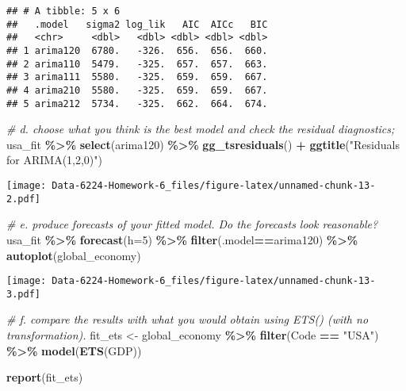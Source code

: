 \documentclass[
]{article}
\newenvironment{Shaded}{\begin{snugshade}}{\end{snugshade}}
\newcommand{\AttributeTok}[1]{\textcolor[rgb]{0.13,0.29,0.53}{#1}}
\newcommand{\CommentTok}[1]{\textcolor[rgb]{0.56,0.35,0.01}{\textit{#1}}}
\newcommand{\DecValTok}[1]{\textcolor[rgb]{0.00,0.00,0.81}{#1}}
\newcommand{\FunctionTok}[1]{\textcolor[rgb]{0.13,0.29,0.53}{\textbf{#1}}}
\newcommand{\NormalTok}[1]{#1}
\newcommand{\OtherTok}[1]{\textcolor[rgb]{0.56,0.35,0.01}{#1}}
\newcommand{\SpecialCharTok}[1]{\textcolor[rgb]{0.81,0.36,0.00}{\textbf{#1}}}
\newcommand{\StringTok}[1]{\textcolor[rgb]{0.31,0.60,0.02}{#1}}
\begin{document}
\begin{verbatim}
## # A tibble: 5 x 6
##   .model   sigma2 log_lik   AIC  AICc   BIC
##   <chr>     <dbl>   <dbl> <dbl> <dbl> <dbl>
## 1 arima120  6780.   -326.  656.  656.  660.
## 2 arima110  5479.   -325.  657.  657.  663.
## 3 arima111  5580.   -325.  659.  659.  667.
## 4 arima210  5580.   -325.  659.  659.  667.
## 5 arima212  5734.   -325.  662.  664.  674.
\end{verbatim}

\begin{Shaded}
\begin{Highlighting}[]
\CommentTok{\# d. choose what you think is the best model and check the residual diagnostics;}
\NormalTok{usa\_fit }\SpecialCharTok{\%\textgreater{}\%}
  \FunctionTok{select}\NormalTok{(arima120) }\SpecialCharTok{\%\textgreater{}\%}
  \FunctionTok{gg\_tsresiduals}\NormalTok{() }\SpecialCharTok{+}
  \FunctionTok{ggtitle}\NormalTok{(}\StringTok{"Residuals for ARIMA(1,2,0)"}\NormalTok{)}
\end{Highlighting}
\end{Shaded}

\texttt{[image: Data-6224-Homework-6\_files/figure-latex/unnamed-chunk-13-2.pdf]}

\begin{Shaded}
\begin{Highlighting}[]
\CommentTok{\# e. produce forecasts of your fitted model. Do the forecasts look reasonable?}
\NormalTok{usa\_fit }\SpecialCharTok{\%\textgreater{}\%}
  \FunctionTok{forecast}\NormalTok{(}\AttributeTok{h=}\DecValTok{5}\NormalTok{) }\SpecialCharTok{\%\textgreater{}\%}
  \FunctionTok{filter}\NormalTok{(.model}\SpecialCharTok{==}\StringTok{\textquotesingle{}arima120\textquotesingle{}}\NormalTok{) }\SpecialCharTok{\%\textgreater{}\%}
  \FunctionTok{autoplot}\NormalTok{(global\_economy)}
\end{Highlighting}
\end{Shaded}

\texttt{[image: Data-6224-Homework-6\_files/figure-latex/unnamed-chunk-13-3.pdf]}

\begin{Shaded}
\begin{Highlighting}[]
\CommentTok{\# f. compare the results with what you would obtain using ETS() (with no transformation).}
\NormalTok{fit\_ets }\OtherTok{\textless{}{-}}\NormalTok{ global\_economy }\SpecialCharTok{\%\textgreater{}\%}
  \FunctionTok{filter}\NormalTok{(Code }\SpecialCharTok{==} \StringTok{"USA"}\NormalTok{) }\SpecialCharTok{\%\textgreater{}\%}
  \FunctionTok{model}\NormalTok{(}\FunctionTok{ETS}\NormalTok{(GDP))}

\FunctionTok{report}\NormalTok{(fit\_ets)}
\end{Highlighting}
\end{Shaded}
\end{document}
